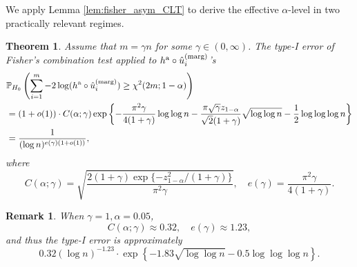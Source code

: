 \documentclass[11pt]{article}
\newtheorem{thm}{Theorem}
\newtheorem{remark}{Remark}
\def\marg{\textnormal{(marg)}}
\def\asym{\textnormal{a}}
\renewcommand{\P}{\mathbb{P}}
\newcommand{\lb}{\left(}
\newcommand{\rb}{\right)}
\begin{document}
We apply Lemma \ref{lem:fisher_asym_CLT} to derive the effective $\alpha$-level in two practically relevant regimes.

\begin{thm}\label{thm:fisher_asym_effective_alpha}
  Assume that $m = \gamma n$ for some $\gamma \in (0, \infty)$. The type-I error of Fisher's combination test applied to $h^\asym\circ \hat{u}_i^\marg$'s
  \begin{align*}
    &\P_{H_0}\lb\sum_{i=1}^{m} -2\log(h^\asym \circ \hat{u}_i^\marg)\ge \chi^2(2m; 1 - \alpha)\rb\\
    &= (1 + o(1))\cdot C(\alpha; \gamma)\exp\left\{-\frac{\pi^2 \gamma}{4(1 + \gamma)}\log\log n - \frac{\pi\sqrt{\gamma}z_{1-\alpha}}{\sqrt{2}(1 + \gamma)}\sqrt{\log \log n} - \frac{1}{2}\log\log\log n\right\}\\
    & = \frac{1}{(\log n)^{e(\gamma)(1 + o(1))}},
  \end{align*}
  where
  \[C(\alpha; \gamma) = \sqrt{\frac{2(1 + \gamma)\exp\{-z_{1-\alpha}^2 / (1 + \gamma)\}}{\pi^2\gamma}}, \quad e(\gamma) = \frac{\pi^2 \gamma}{4(1 + \gamma)}.\]
\end{thm}
\begin{remark}
  When $\gamma = 1, \alpha = 0.05$,
  \[C(\alpha; \gamma)\approx 0.32, \quad e(\gamma)\approx 1.23,\]
  and thus the type-I error is approximately
  \[0.32(\log n)^{-1.23} \cdot \exp\left\{-1.83\sqrt{\log\log n} - 0.5\log\log \log n\right\}.\]
\end{remark}
\end{document}
